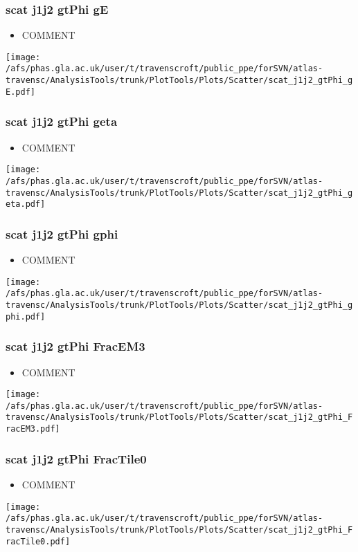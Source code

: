\documentclass{beamer}
\begin{document}
\begin{frame}
\frametitle{scat j1j2 gtPhi gE}
\begin{itemize}
\item COMMENT
\end{itemize}
\begin{center}
\texttt{[image: /afs/phas.gla.ac.uk/user/t/travenscroft/public\_ppe/forSVN/atlas-travensc/AnalysisTools/trunk/PlotTools/Plots/Scatter/scat\_j1j2\_gtPhi\_gE.pdf]}
\end{center}
\end{frame}

\begin{frame}
\frametitle{scat j1j2 gtPhi geta}
\begin{itemize}
\item COMMENT
\end{itemize}
\begin{center}
\texttt{[image: /afs/phas.gla.ac.uk/user/t/travenscroft/public\_ppe/forSVN/atlas-travensc/AnalysisTools/trunk/PlotTools/Plots/Scatter/scat\_j1j2\_gtPhi\_geta.pdf]}
\end{center}
\end{frame}

\begin{frame}
\frametitle{scat j1j2 gtPhi gphi}
\begin{itemize}
\item COMMENT
\end{itemize}
\begin{center}
\texttt{[image: /afs/phas.gla.ac.uk/user/t/travenscroft/public\_ppe/forSVN/atlas-travensc/AnalysisTools/trunk/PlotTools/Plots/Scatter/scat\_j1j2\_gtPhi\_gphi.pdf]}
\end{center}
\end{frame}

\begin{frame}
\frametitle{scat j1j2 gtPhi FracEM3}
\begin{itemize}
\item COMMENT
\end{itemize}
\begin{center}
\texttt{[image: /afs/phas.gla.ac.uk/user/t/travenscroft/public\_ppe/forSVN/atlas-travensc/AnalysisTools/trunk/PlotTools/Plots/Scatter/scat\_j1j2\_gtPhi\_FracEM3.pdf]}
\end{center}
\end{frame}

\begin{frame}
\frametitle{scat j1j2 gtPhi FracTile0}
\begin{itemize}
\item COMMENT
\end{itemize}
\begin{center}
\texttt{[image: /afs/phas.gla.ac.uk/user/t/travenscroft/public\_ppe/forSVN/atlas-travensc/AnalysisTools/trunk/PlotTools/Plots/Scatter/scat\_j1j2\_gtPhi\_FracTile0.pdf]}
\end{center}
\end{frame}
\end{document}
